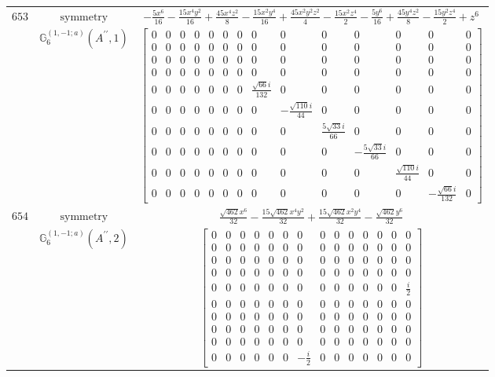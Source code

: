 \documentclass[fleqn,8pt,landscape]{jsarticle}
\begin{document}
\begin{longtable}{ccc}
$ 653 $ & $ \text{symmetry} $ & $ - \frac{5 x^{6}}{16} - \frac{15 x^{4} y^{2}}{16} + \frac{45 x^{4} z^{2}}{8} - \frac{15 x^{2} y^{4}}{16} + \frac{45 x^{2} y^{2} z^{2}}{4} - \frac{15 x^{2} z^{4}}{2} - \frac{5 y^{6}}{16} + \frac{45 y^{4} z^{2}}{8} - \frac{15 y^{2} z^{4}}{2} + z^{6} $ \\
$  $ & $ \mathbb{G}_{6}^{(1,-1;a)}(A^{\prime\prime},1) $ & $ \begin{bmatrix} 0 & 0 & 0 & 0 & 0 & 0 & 0 & 0 & 0 & 0 & 0 & 0 & 0 & 0 \\ 0 & 0 & 0 & 0 & 0 & 0 & 0 & 0 & 0 & 0 & 0 & 0 & 0 & 0 \\ 0 & 0 & 0 & 0 & 0 & 0 & 0 & 0 & 0 & 0 & 0 & 0 & 0 & 0 \\ 0 & 0 & 0 & 0 & 0 & 0 & 0 & 0 & 0 & 0 & 0 & 0 & 0 & 0 \\ 0 & 0 & 0 & 0 & 0 & 0 & 0 & \frac{\sqrt{66} i}{132} & 0 & 0 & 0 & 0 & 0 & 0 \\ 0 & 0 & 0 & 0 & 0 & 0 & 0 & 0 & - \frac{\sqrt{110} i}{44} & 0 & 0 & 0 & 0 & 0 \\ 0 & 0 & 0 & 0 & 0 & 0 & 0 & 0 & 0 & \frac{5 \sqrt{33} i}{66} & 0 & 0 & 0 & 0 \\ 0 & 0 & 0 & 0 & 0 & 0 & 0 & 0 & 0 & 0 & - \frac{5 \sqrt{33} i}{66} & 0 & 0 & 0 \\ 0 & 0 & 0 & 0 & 0 & 0 & 0 & 0 & 0 & 0 & 0 & \frac{\sqrt{110} i}{44} & 0 & 0 \\ 0 & 0 & 0 & 0 & 0 & 0 & 0 & 0 & 0 & 0 & 0 & 0 & - \frac{\sqrt{66} i}{132} & 0 \end{bmatrix} $ \\ \hline
$ 654 $ & $ \text{symmetry} $ & $ \frac{\sqrt{462} x^{6}}{32} - \frac{15 \sqrt{462} x^{4} y^{2}}{32} + \frac{15 \sqrt{462} x^{2} y^{4}}{32} - \frac{\sqrt{462} y^{6}}{32} $ \\
$  $ & $ \mathbb{G}_{6}^{(1,-1;a)}(A^{\prime\prime},2) $ & $ \begin{bmatrix} 0 & 0 & 0 & 0 & 0 & 0 & 0 & 0 & 0 & 0 & 0 & 0 & 0 & 0 \\ 0 & 0 & 0 & 0 & 0 & 0 & 0 & 0 & 0 & 0 & 0 & 0 & 0 & 0 \\ 0 & 0 & 0 & 0 & 0 & 0 & 0 & 0 & 0 & 0 & 0 & 0 & 0 & 0 \\ 0 & 0 & 0 & 0 & 0 & 0 & 0 & 0 & 0 & 0 & 0 & 0 & 0 & 0 \\ 0 & 0 & 0 & 0 & 0 & 0 & 0 & 0 & 0 & 0 & 0 & 0 & 0 & \frac{i}{2} \\ 0 & 0 & 0 & 0 & 0 & 0 & 0 & 0 & 0 & 0 & 0 & 0 & 0 & 0 \\ 0 & 0 & 0 & 0 & 0 & 0 & 0 & 0 & 0 & 0 & 0 & 0 & 0 & 0 \\ 0 & 0 & 0 & 0 & 0 & 0 & 0 & 0 & 0 & 0 & 0 & 0 & 0 & 0 \\ 0 & 0 & 0 & 0 & 0 & 0 & 0 & 0 & 0 & 0 & 0 & 0 & 0 & 0 \\ 0 & 0 & 0 & 0 & 0 & 0 & - \frac{i}{2} & 0 & 0 & 0 & 0 & 0 & 0 & 0 \end{bmatrix} $ \\ \hline

\end{longtable}
\end{document}
